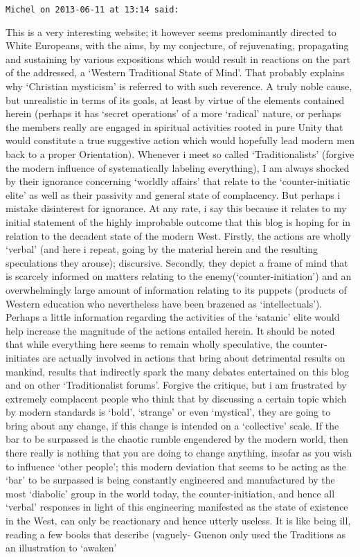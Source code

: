\begin{footnotesize}
\begin{sffamily}
\hfill

\texttt{Michel on 2013-06-11 at 13:14 said:}

This is a very interesting website; it however seems predominantly directed to White Europeans, with the aims, by my conjecture, of rejuvenating, propagating and sustaining by various expositions which would result in reactions on the part of the addressed, a `Western Traditional State of Mind'. That probably explains why `Christian mysticism' is referred to with such reverence. A truly noble cause, but unrealistic in terms of its goals, at least by virtue of the elements contained herein (perhaps it has `secret operations' of a more `radical' nature, or perhaps the members really are engaged in spiritual activities rooted in pure Unity that would constitute a true suggestive action which would hopefully lead modern men back to a proper Orientation). Whenever i meet so called `Traditionalists' (forgive the modern influence of systematically labeling everything), I am always shocked by their ignorance concerning `worldly affairs' that relate to the `counter-initiatic elite' as well as their passivity and general state of complacency. But perhaps i mistake disinterest for ignorance. At any rate, i say this because it relates to my initial statement of the highly improbable outcome that this blog is hoping for in relation to the decadent state of the modern West. Firstly, the actions are wholly `verbal' (and here i repeat, going by the material herein and the resulting speculations they arouse); discursive. Secondly, they depict a frame of mind that is scarcely informed on matters relating to the enemy(`counter-initiation') and an overwhelmingly large amount of information relating to its puppets (products of Western education who nevertheless have been brazened as `intellectuals'). Perhaps a little information regarding the activities of the `satanic' elite would help increase the magnitude of the actions entailed herein. It should be noted that while everything here seems to remain wholly speculative, the counter-initiates are actually involved in actions that bring about detrimental results on mankind, results that indirectly spark the many debates entertained on this blog and on other `Traditionalist forums'. Forgive the critique, but i am frustrated by extremely complacent people who think that by discussing a certain topic which by modern standards is `bold', `strange' or even `mystical', they are going to bring about any change, if this change is intended on a `collective' scale. If the bar to be surpassed is the chaotic rumble engendered by the modern world, then there really is nothing that you are doing to change anything, insofar as you wish to influence `other people'; this modern deviation that seems to be acting as the `bar' to be surpassed is being constantly engineered and manufactured by the most `diabolic' group in the world today, the counter-initiation, and hence all `verbal' responses in light of this engineering manifested as the state of existence in the West, can only be reactionary and hence utterly useless. It is like being ill, reading a few books that describe (vaguely- Guenon only used the Traditions as an illustration to `awaken' 
\end{sffamily}
\end{footnotesize}
